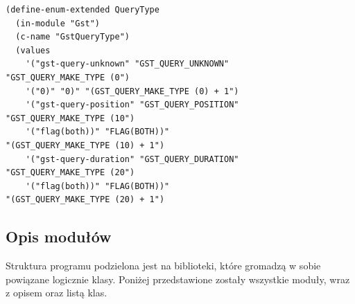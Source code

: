 \documentclass[12pt]{article}
\begin{document}
    \begin{lstlisting}[caption=Błędnie wygenerowany kod przez generator, label=badEnumForGenerator]
(define-enum-extended QueryType
  (in-module "Gst")
  (c-name "GstQueryType")
  (values
    '("gst-query-unknown" "GST_QUERY_UNKNOWN" 
"GST_QUERY_MAKE_TYPE (0")
    '("0)" "0)" "(GST_QUERY_MAKE_TYPE (0) + 1")
    '("gst-query-position" "GST_QUERY_POSITION" 
"GST_QUERY_MAKE_TYPE (10")
    '("flag(both))" "FLAG(BOTH))" 
"(GST_QUERY_MAKE_TYPE (10) + 1")
    '("gst-query-duration" "GST_QUERY_DURATION" 
"GST_QUERY_MAKE_TYPE (20")
    '("flag(both))" "FLAG(BOTH))" 
"(GST_QUERY_MAKE_TYPE (20) + 1")
    \end{lstlisting}

\subsection{Opis modułów}
Struktura programu podzielona jest na biblioteki, które gromadzą w sobie powiązane logicznie klasy. Poniżej przedstawione zostały wszystkie moduły, wraz z opisem oraz listą klas.
\end{document}
